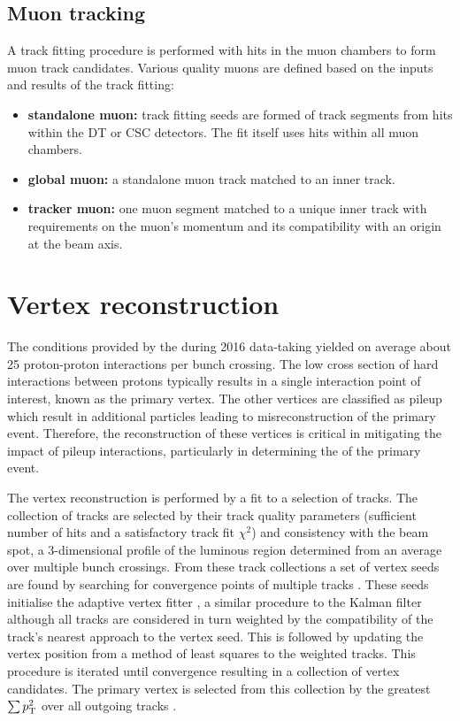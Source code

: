 \subsection{Muon tracking}\label{subsec:muon-tracking}

A track fitting procedure is performed with hits in the muon chambers to form
muon track candidates. Various quality muons are defined based on the inputs
and results of the track fitting:

\begin{itemize}
    \item \textbf{standalone muon:} track fitting seeds are formed of track
    segments from hits within the DT or CSC detectors. The fit itself uses
    hits within all muon chambers.
    \item \textbf{global muon:} a standalone muon track matched to an inner
    track.
    \item \textbf{tracker muon:} one muon segment matched to a unique inner
    track with requirements on the muon's momentum and its compatibility with
    an origin at the beam axis.
\end{itemize}


\section{Vertex reconstruction}\label{sec:vertex-reco}

The conditions provided by the \LHC during 2016 data-taking yielded on average
about 25 proton-proton interactions per bunch crossing. The low cross section of hard interactions between protons typically results in a single interaction point of interest, known as the primary vertex. The
other vertices are classified as pileup which result in additional particles
leading to misreconstruction of the primary event. Therefore, the reconstruction
of these vertices is critical in mitigating the impact of pileup interactions,
particularly in determining the \ptmiss of the primary event.

The vertex reconstruction is performed by a fit to a selection of tracks. The
collection of tracks are selected by their track quality parameters
(sufficient number of hits and a satisfactory track fit $\chi^2$) and
consistency with the beam spot, a 3-dimensional profile of the luminous
region determined from an average over multiple bunch crossings. From these
track collections a set of vertex seeds are found by searching for convergence
points of multiple tracks \cite{Speer:927395}. These seeds initialise the
adaptive vertex fitter \cite{Fruhwirth:1027031}, a similar procedure to the
Kalman filter although all tracks are considered in turn weighted by the
compatibility of the track's nearest approach to the vertex seed. This is
followed by updating the vertex position from a method of least squares to the
weighted tracks. This procedure is iterated until convergence resulting in a
collection of vertex candidates. The primary vertex is selected from this
collection by the greatest $\sum p_{\text{T}}^2$ over all outgoing tracks
\cite{Sirunyan:2017ulk}.


